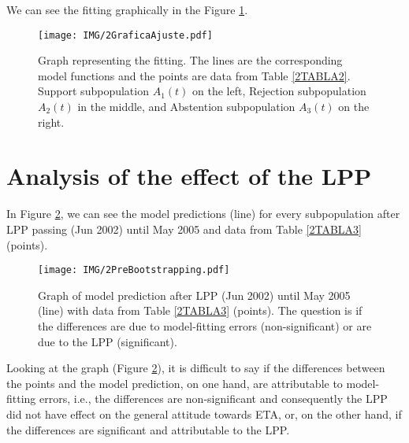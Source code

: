 We can see the fitting graphically in the Figure \ref{2Ajuste}.

\begin{figure}[h]
 \begin{center}
  \texttt{[image: IMG/2GraficaAjuste.pdf]}\\
  \caption{Graph representing the fitting. The lines are the corresponding model functions and the points are data from Table \ref{2TABLA2}. Support subpopulation $A_1(t)$ on the left, Rejection subpopulation $A_2(t)$ in the middle, and Abstention subpopulation $A_3(t)$ on the right.} \label{2Ajuste}
\end{center}
\end{figure} 

\section{Analysis of the effect of the LPP}\label{2.4}
In Figure \ref{2Pre}, we can see the model predictions (line) for every subpopulation after LPP passing (Jun 2002) until May 2005 and data from Table \ref{2TABLA3} (points).

\begin{figure}[h]
 \begin{center}
  \texttt{[image: IMG/2PreBootstrapping.pdf]}\\
  \caption{Graph of model prediction after LPP (Jun 2002) until May 2005 (line) with data from Table \ref{2TABLA3} (points). The question is if the differences are due to model-fitting errors (non-significant) or are due to the LPP (significant).} \label{2Pre}
\end{center}
\end{figure} 

Looking at the graph (Figure \ref{2Pre}), it is difficult to say if the differences between the points and the model prediction, on one hand, are attributable to model-fitting errors, i.e., the differences are non-significant and consequently the LPP did not have effect on the general attitude towards ETA, or, on the other hand, if the differences are significant and attributable to the LPP.

